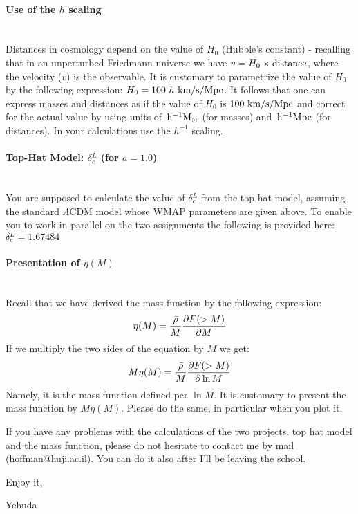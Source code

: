 \documentclass[11pt]{amsart}
\newcommand{\hmsun}{{\,\rm h^{-1}M}_\odot}
\newcommand{\hmpc}{{\,\rm h^{-1}Mpc}}
\begin{document}
\paragraph{\bf Use of the $h$ scaling } \hspace{10pt} \\
Distances in cosmology depend on the value of $H_0$ (Hubble's constant) - recalling that in an unperturbed Friedmann universe we have $v=H_0\times {\rm distance}$, where the velocity ($v$) is the observable. It is customary  to parametrize the value of $H_0$ by the following expression: $H_0 = 100\  h\ {\rm km/s/Mpc }$. It follows that one can express masses and distances as if the value of $H_0$ is $100\   {\rm km/s/Mpc }$ and correct for the actual value by using units of $\hmsun$ (for   masses) and 
$\hmpc$ (for distances). In your calculations use the $h^{-1}$ scaling.

\paragraph{\bf Top-Hat Model: $\delta{^L_c}$ (for $a=1.0$) } \hspace{10pt}\\
You are supposed to calculate the value of  $\delta{^L_c}$ from the top hat model, assuming the standard $\Lambda$CDM model whose WMAP parameters are given above. To   enable you to work in parallel on the two assignments the following  is provided here:   $\delta{^L_c}=1.67484$ 

\paragraph{\bf Presentation of $\eta(M)$}  \hspace{10pt}\\
Recall that we have derived the mass function by the following expression: 
$$\eta(M)={\bar{\rho}\over M} {\partial F(>M)\over\partial M}$$
If we multiply the two sides of the equation by $M$ we get:
$$M \eta(M)={\bar{\rho}\over M}  {\partial F(>M)\over\partial \ln M}$$
Namely, it is the mass function defined per $\ln M$.
It is customary to present the mass function by $M \eta(M)$. Please do the same, in particular when you plot it.

\bigskip
If you have any problems with the calculations of the two projects, top hat model and the mass function, please do not hesitate to contact me by mail (hoffman@huji.ac.il). You can do it also after I'll be leaving the school.

Enjoy it,

Yehuda
\end{document}
